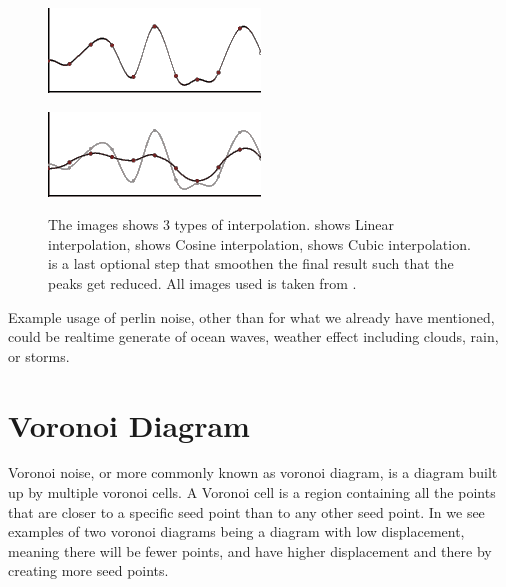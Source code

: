 \begin{figure}[H]
\begin{minipage}[b]{.5\linewidth}
	\end{minipage}
	\begin{minipage}[b]{.5\linewidth}
		\includegraphics[width=0.95\linewidth]{img/m_inter4}
		\label{fig:1c}
	\end{minipage}%
	\begin{minipage}[b]{.5\linewidth}
		\includegraphics[width=0.95\linewidth]{img/m_inter6}
		\label{fig:1d}
	\end{minipage}%

	\centering
	\caption{The images shows 3 types of interpolation.  shows Linear interpolation,  shows Cosine interpolation,  shows Cubic interpolation.  is a last optional step that smoothen the final result such that the peaks get reduced. All images used is taken from \cite{perlinnoise2}.}
	\label{fig:interpolation}
\end{figure}

Example usage of perlin noise, other than for what we already have mentioned, could be realtime generate of ocean waves, weather effect including clouds, rain, or storms.


\section{Voronoi Diagram}
\label{VoronoiDiagram}
Voronoi noise, or more commonly known as voronoi diagram, is a diagram built up by multiple voronoi cells. A Voronoi cell is a region containing all the points that are closer to a specific seed point than to any other seed point\cite{libnoiseVoronoi}. In  we see examples of two voronoi diagrams  being a diagram with low displacement, meaning there will be fewer points, and  have higher displacement and there by creating more seed points.

